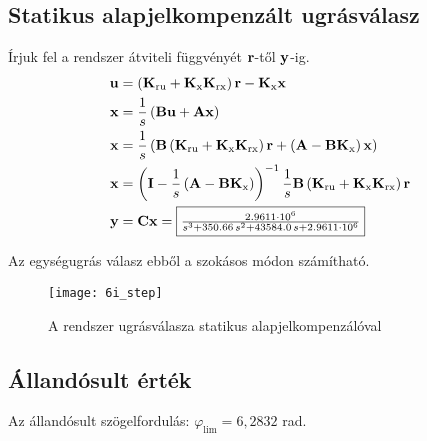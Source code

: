 
\subsection{Statikus alapjelkompenzált ugrásválasz}

Írjuk fel a rendszer átviteli függvényét $\B{r}$-től $\B{y}$-ig.
\begin{align}
	\B{u} &= \brc{\B{K}_\text{ru}+\B{K}_\text{x}\B{K}_\text{rx}}\B{r} - \B{K}_\text{x}\B{x}\\
	\B{x} &= \frac{1}{s}\brc{\B{B}\B{u} + \B{A}\B{x}}\\
	\B{x} &= \frac{1}{s}\brc{\B{B}\brc{\B{K}_\text{ru}+\B{K}_\text{x}\B{K}_\text{rx}}\B{r}+\brc{\B{A}-\B{B}\B{K}_\text{x}}\B{x}}\\
	\B{x} &= \brc{\B{I}-\frac{1}{s}\brc{\B{A}-\B{B}\B{K}_\text{x} }}^{-1}\frac{1}{s}\B{B}\brc{\B{K}_\text{ru}+\B{K}_\text{x}\B{K}_\text{rx}}\B{r}\\
	\B{y} &= \B{C}\B{x} =
	\fbox{$\frac{2.9611\cdot 10^6}{s^3 + 350.66\, s^2 + 43584.0\, s + 2.9611\cdot 10^6}$}
\end{align}

Az egységugrás válasz ebből a szokásos módon számítható.
\begin{figure}[H]
	\centering
	\texttt{[image: 6i\_step]}
	\caption{A rendszer ugrásválasza statikus alapjelkompenzálóval}
	\label{fig:6i_step}
\end{figure}


\subsection{Állandósult érték}

Az állandósult szögelfordulás: $\varphi_\text{lim} = 6,2832$ rad.

